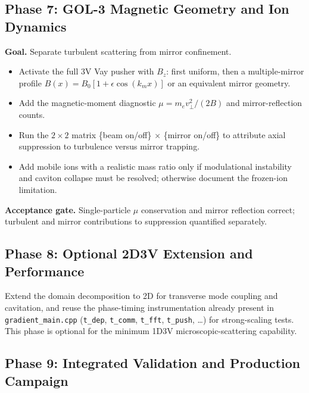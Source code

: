 \documentclass[11pt,a4paper]{article}
\begin{document}
\subsection{Phase 7: GOL-3 Magnetic Geometry and Ion Dynamics}

\textbf{Goal.} Separate turbulent scattering from mirror confinement.

\begin{itemize}[leftmargin=*]
  \item Activate the full 3V Vay pusher with $B_z$: first uniform, then a multiple-mirror profile
        $B(x)=B_0[1+\epsilon\cos(k_m x)]$ or an equivalent mirror geometry.
  \item Add the magnetic-moment diagnostic $\mu=m_e v_\perp^2/(2B)$ and mirror-reflection counts.
  \item Run the $2\times2$ matrix \{beam on/off\} $\times$ \{mirror on/off\} to attribute axial
        suppression to turbulence versus mirror trapping.
  \item Add mobile ions with a realistic mass ratio only if modulational instability and caviton
        collapse must be resolved; otherwise document the frozen-ion limitation.
\end{itemize}

\textbf{Acceptance gate.} Single-particle $\mu$ conservation and mirror reflection correct;
turbulent and mirror contributions to suppression quantified separately.

\subsection{Phase 8: Optional 2D3V Extension and Performance}

Extend the domain decomposition to 2D for transverse mode coupling and cavitation, and reuse the
phase-timing instrumentation already present in \texttt{gradient\_main.cpp}
(\texttt{t\_dep}, \texttt{t\_comm}, \texttt{t\_fft}, \texttt{t\_push}, \ldots) for strong-scaling
tests. This phase is optional for the minimum 1D3V microscopic-scattering capability.

\subsection{Phase 9: Integrated Validation and Production Campaign}
\end{document}
